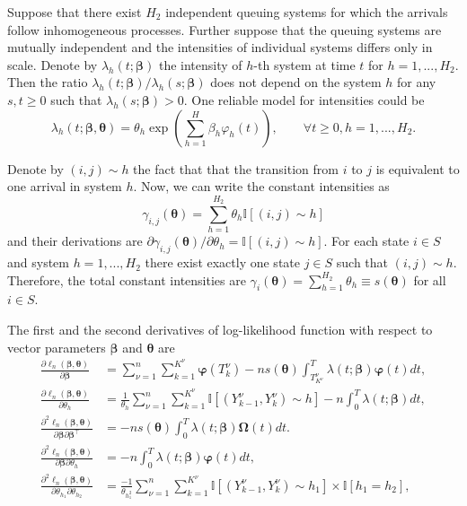 {\begin{example}
	Suppose that there exist $H_2$ independent queuing systems for which the arrivals follow inhomogeneous processes. Further suppose that the queuing systems are mutually independent and the intensities of individual systems differs only in scale. Denote by $\lambda_h (t; \bm{\beta})$ the intensity of $h$-th system at time $t$ for $h = 1, ..., H_2$. Then the ratio $\lambda_h (t; \bm{\beta}) / \lambda_h (s; \bm{\beta})$ does not depend on the system $h$ for any $s,t \geq 0$ such that $\lambda_h (s; \bm{\beta}) > 0$. One reliable model for intensities could be
	\begin{equation*}
		\lambda_h (t; \bm{\beta}, \bm{\theta}) = \theta_h \exp \left( \sum_{h=1}^{H} \beta_h \varphi_h (t) \right), \qquad \forall t \geq 0, h=1,...,H_2.
	\end{equation*}
	
	Denote by $(i,j) \sim h$ the fact that that the transition from $i$ to $j$ is equivalent to one arrival in system $h$. Now, we can write the constant intensities as
	\[
		\gamma_{i,j} (\bm{\theta})= \sum_{h=1}^{H_2} \theta_h \mathbb{I} [(i,j) \sim h]
	\]
	and their derivations are $\partial \gamma_{i,j} (\bm{\theta}) / \partial \theta_h = \mathbb{I} [(i,j) \sim h]$. For each state $i \in S$ and system $h = 1, ..., H_2$ there exist exactly one state $j \in S$ such that $(i,j) \sim h$. Therefore, the total constant intensities are $\gamma_{i} (\bm{\theta})= \sum_{h=1}^{H_2} \theta_h \equiv s(\bm{\theta})$ for all $i \in S$.
	
	The first and the second derivatives of log-likelihood function with respect to vector parameters $\bm{\beta}$ and $\bm{\theta}$ are
	\begin{align*}
		\frac{\partial \ell_n (\bm{\beta}, \bm{\theta})}{\partial \bm{\beta}} &=
		\sum_{\nu=1}^n \sum_{k=1}^{K^{\nu}} \bm{\varphi} (T_k^{\nu}) 
		- n s(\bm{\theta}) \int_{T_{K^{\nu}}^{\nu}}^{T} \lambda(t; \bm{\beta}) \bm{\varphi} (t) dt,
		\\
				\frac{\partial \ell_n (\bm{\beta}, \bm{\theta})}{\partial \theta_h}
		&= \frac{1}{\theta_h} \sum_{\nu=1}^n
		\sum_{k=1}^{K^{\nu}} \mathbb{I} [(Y_{k-1}^{\nu}, Y_{k}^{\nu}) \sim h] -
		 n \int_{0}^{T} \lambda(t; \bm{\beta}) dt,
		\\
		\frac{\partial^2 \ell_n (\bm{\beta}, \bm{\theta})}{\partial \bm{\beta} \partial \bm{\beta}^{\top}}
		&= - n s(\bm{\theta}) \int_{0}^{T} \lambda(t; \bm{\beta}) \bm{\Omega} (t) dt.
		\\
		\frac{\partial^2 \ell_n (\bm{\beta}, \bm{\theta})}{\partial \bm{\beta} \partial \theta_h}
		&= - n \int_{0}^{T} \lambda(t; \bm{\beta}) \bm{\varphi} (t) dt,
		\\
		\frac{\partial^2 \ell_n (\bm{\beta}, \bm{\theta})}{\partial \theta_{h_1} \partial \theta_{h_2}}
		&= \frac{-1}{\theta_h_1^2} \sum_{\nu=1}^n
		\sum_{k=1}^{K^{\nu}} \mathbb{I} [(Y_{k-1}^{\nu}, Y_{k}^{\nu}) \sim h_1]
			\times \mathbb{I} [h_1 = h_2],
	\end{align*}
	

\end{example}}
